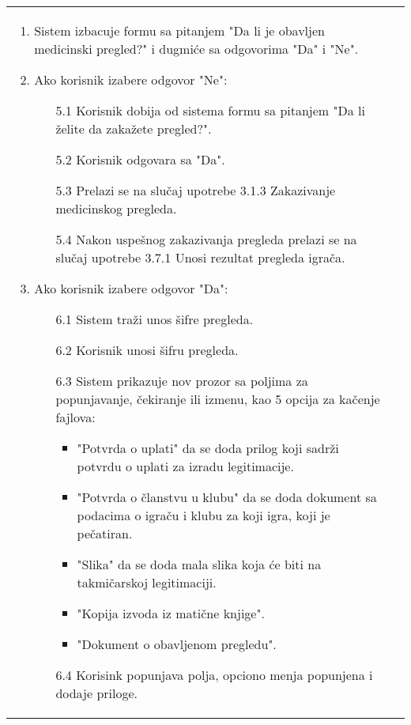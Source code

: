 \documentclass{article}
\begin{document}
\begin{longtable}{| p{} | p{} |}
\begin{enumerate}
                    \item Sistem izbacuje formu sa pitanjem "Da li je obavljen medicinski pregled?" i dugmiće sa odgovorima "Da" i "Ne".
                    \item Ako korisnik izabere odgovor "Ne":
                    \begin{enumerate}
                        \item[5.1] Korisnik dobija od sistema formu sa pitanjem "Da li želite da zakažete pregled?".
                        \item[5.2] Korisnik odgovara sa "Da".
                        \item[5.3] Prelazi se na slučaj upotrebe 3.1.3 Zakazivanje medicinskog pregleda.
                        \item[5.4] Nakon uspešnog zakazivanja pregleda prelazi se na slučaj upotrebe 3.7.1 Unosi rezultat pregleda igrača.
                    \end{enumerate}
                    \item Ako korisnik izabere odgovor "Da":
                    \begin{enumerate}
                        \item[6.1] Sistem traži unos šifre pregleda.
                        \item[6.2] Korisnik unosi šifru pregleda.
                        \item[6.3] Sistem prikazuje nov prozor sa poljima za popunjavanje, čekiranje ili izmenu, kao 5 opcija za kačenje fajlova:
                        \begin{itemize}
                            \item "Potvrda o uplati" da se doda prilog koji sadrži potvrdu o uplati za izradu legitimacije.
                            \item "Potvrda o članstvu u klubu" da se doda dokument sa podacima o igraču i klubu za koji igra, koji je pečatiran.
                            \item "Slika" da se doda mala slika koja će biti na takmičarskoj legitimaciji.
                            \item "Kopija izvoda iz matične knjige".
                            \item "Dokument o obavljenom pregledu".
                        \end{itemize}  
                        \item[6.4] Korisink popunjava polja, opciono menja popunjena i dodaje priloge.

\end{enumerate}
\end{enumerate}
\end{longtable}
\end{document}
